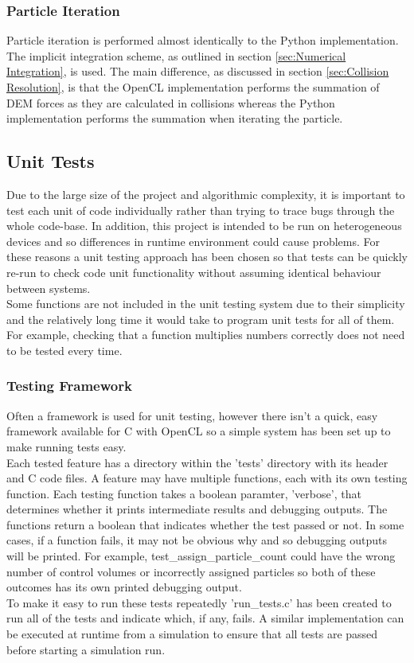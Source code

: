 \documentclass[10pt,a4paper,titlepage]{report}
\begin{document}
\subsubsection{Particle Iteration}
Particle iteration is performed almost identically to the Python implementation. The implicit integration scheme, as outlined in section \ref{sec:Numerical Integration}, is used. The main difference, as discussed in section \ref{sec:Collision Resolution}, is that the OpenCL implementation performs the summation of DEM forces as they are calculated in collisions whereas the Python implementation performs the summation when iterating the particle.
\subsection{Unit Tests}
Due to the large size of the project and algorithmic complexity, it is important to test each unit of code individually rather than trying to trace bugs through the whole code-base. In addition, this project is intended to be run on heterogeneous devices and so differences in runtime environment could cause problems. For these reasons a unit testing approach has been chosen so that tests can be quickly re-run to check code unit functionality without assuming identical behaviour between systems.
\\Some functions are not included in the unit testing system due to their simplicity and the relatively long time it would take to program unit tests for all of them. For example, checking that a function multiplies numbers correctly does not need to be tested every time.
\subsubsection{Testing Framework}
Often a framework is used for unit testing, however there isn't a quick, easy framework available for C with OpenCL so a simple system has been set up to make running tests easy.
\\Each tested feature has a directory within the 'tests' directory with its header and C code files. A feature may have multiple functions, each with its own testing function. Each testing function takes a boolean paramter, 'verbose', that determines whether it prints intermediate results and debugging outputs. The functions return a boolean that indicates whether the test passed or not. In some cases, if a function fails, it may not be obvious why and so debugging outputs will be printed. For example, test\_assign\_particle\_count could have the wrong number of control volumes or incorrectly assigned particles so both of these outcomes has its own printed debugging output. %
\\To make it easy to run these tests repeatedly 'run\_tests.c' has been created to run all of the tests and indicate which, if any, fails. A similar implementation can be executed at runtime from a simulation to ensure that all tests are passed before starting a simulation run.
\end{document}
